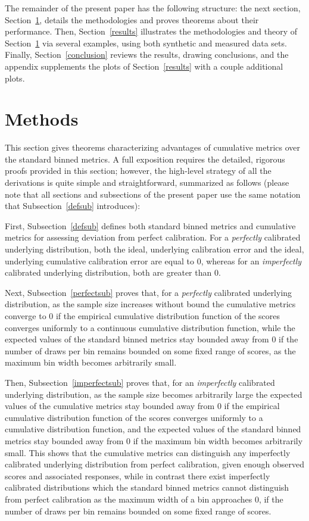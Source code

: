 \documentclass{article}
\begin{document}
The remainder of the present paper has the following structure:
the next section, Section~\ref{methods},
details the methodologies and proves theorems about their performance.
Then, Section~\ref{results} illustrates the methodologies and theory
of Section~\ref{methods} via several examples,
using both synthetic and measured data sets. Finally, Section~\ref{conclusion} 
reviews the results, drawing conclusions, and the appendix supplements
the plots of Section~\ref{results} with a couple additional plots.



\section{Methods}
\label{methods}

This section gives theorems characterizing advantages of cumulative metrics
over the standard binned metrics. A full exposition requires
the detailed, rigorous proofs provided in this section; however,
the high-level strategy of all the derivations is quite simple
and straightforward, summarized as follows (please note that all sections
and subsections of the present paper use the same notation
that Subsection~\ref{defsub} introduces):

First, Subsection~\ref{defsub} defines both standard binned metrics
and cumulative metrics for assessing deviation from perfect calibration.
For a {\it perfectly} calibrated underlying distribution,
both the ideal, underlying calibration error
and the ideal, underlying cumulative calibration error are equal to 0,
whereas for an {\it imperfectly} calibrated underlying distribution,
both are greater than 0.

Next, Subsection~\ref{perfectsub} proves that,
for a {\it perfectly} calibrated underlying distribution,
as the sample size increases without bound
the cumulative metrics converge to 0
if the empirical cumulative distribution function of the scores
converges uniformly to a continuous cumulative distribution function,
while the expected values
of the standard binned metrics stay bounded away from 0
if the number of draws per bin remains bounded on some fixed range of scores,
as the maximum bin width becomes arbitrarily small.

Then, Subsection~\ref{imperfectsub} proves that,
for an {\it imperfectly} calibrated underlying distribution,
as the sample size becomes arbitrarily large
the expected values of the cumulative metrics stay bounded away from 0
if the empirical cumulative distribution function of the scores
converges uniformly to a cumulative distribution function,
and the expected values of the standard binned metrics stay bounded away from 0
if the maximum bin width becomes arbitrarily small.
This shows that the cumulative metrics can distinguish
any imperfectly calibrated underlying distribution from perfect calibration,
given enough observed scores and associated responses,
while in contrast there exist imperfectly calibrated distributions
which the standard binned metrics cannot distinguish
from perfect calibration as the maximum width of a bin approaches 0,
if the number of draws per bin remains bounded on some fixed range of scores.
\end{document}
